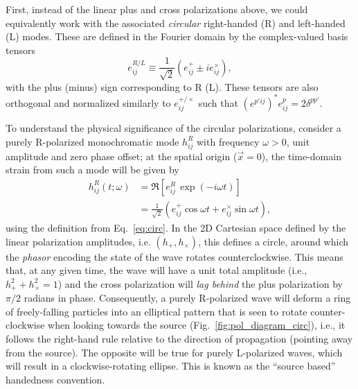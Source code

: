 \documentclass[aps,prd,twocolumn,superscriptaddress,preprintnumbers,floatfix,nofootinbib]{revtex4-2}
\newcommand{\beq}{\begin{equation}}
\newcommand{\eeq}{\end{equation}}
\begin{document}
First, instead of the linear plus and cross polarizations above, we could equivalently work with the associated \emph{circular} right-handed (R) and left-handed (L) modes.
These are defined in the Fourier domain by the complex-valued basis tensors
\beq \label{eq:circ}
e^{R/L}_{ij} \equiv \frac{1}{\sqrt{2}} \left(e^+_{ij} \pm i e^\times_{ij} \right) ,
\eeq
with the plus (minus) sign corresponding to R (L).
These tensors are also orthogonal and normalized similarly to $e^{+/\times}_{ij}$ such that $(e^{p'ij})^* e^p_{ij} = 2 \delta^{pp'}$.

To understand the physical significance of the circular polarizations,
consider a purely R-polarized monochromatic mode $h^R_{ij}$ with frequency $\omega > 0$, unit amplitude and zero phase offset; at the spatial origin ($\vec{x}=0$), the time-domain strain from such a mode will be given by
\begin{align} \label{eq:circ_example}
h_{ij}^R(t;\omega) &= \Re \left[ e^R_{ij}\, \exp(-i\omega t) \right] \nonumber\\
&= \frac{1}{\sqrt{2}} \left( e^+_{ij} \cos \omega t + e^\times_{ij} \sin \omega t \right) ,
\end{align}
using the definition from Eq.~\eqref{eq:circ}.
In the 2D Cartesian space defined by the linear polarization amplitudes, i.e. $\left(h_+, h_\times\right)$, this defines a circle, around which the \emph{phasor} encoding the state of the wave rotates counterclockwise.
This means that, at any given time, the wave will have a unit total amplitude (i.e., $h^2_+ + h^2_\times=1$) and the cross polarization will \emph{lag behind} the plus polarization by $\pi/2$ radians in phase.
%
Consequently, a purely R-polarized wave will deform a ring of freely-falling particles into an elliptical pattern that is seen to rotate counter-clockwise when looking towards the source (Fig.~\ref{fig:pol_diagram_circ}), i.e., it follows the right-hand rule relative to the direction of propagation (pointing away from the source).
The opposite will be true for purely L-polarized waves, which will result in a clockwise-rotating ellipse.
This is known as the ``source based'' handedness convention.
\end{document}
